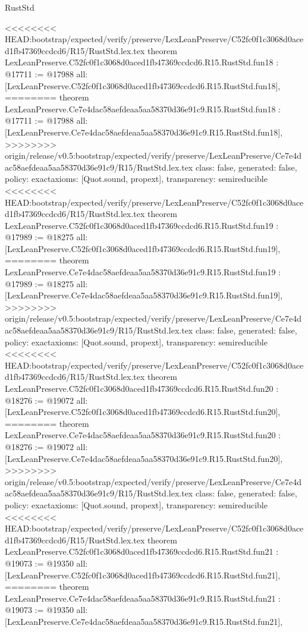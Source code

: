 \begin{lexlean}{RustStd}
\begin{coremodule}
{\begin{coremodule}
{{{{{{{{{{{{{{{{{{{{{}
<<<<<<<< HEAD:bootstrap/expected/verify/preserve/LexLeanPreserve/C52fc0f1c3068d0aced1fb47369ccdcd6/R15/RustStd.lex.tex
theorem LexLeanPreserve.C52fc0f1c3068d0aced1fb47369ccdcd6.R15.RustStd.fun18 : @17711 := @17988 {
  all: [LexLeanPreserve.C52fc0f1c3068d0aced1fb47369ccdcd6.R15.RustStd.fun18],
========
theorem LexLeanPreserve.Ce7e4dac58aefdeaa5aa58370d36e91c9.R15.RustStd.fun18 : @17711 := @17988 {
  all: [LexLeanPreserve.Ce7e4dac58aefdeaa5aa58370d36e91c9.R15.RustStd.fun18],
>>>>>>>> origin/release/v0.5:bootstrap/expected/verify/preserve/LexLeanPreserve/Ce7e4dac58aefdeaa5aa58370d36e91c9/R15/RustStd.lex.tex
  class: false,
  generated: false,
  policy: exact{axioms: [Quot.sound, propext]},
  transparency: semireducible
}
<<<<<<<< HEAD:bootstrap/expected/verify/preserve/LexLeanPreserve/C52fc0f1c3068d0aced1fb47369ccdcd6/R15/RustStd.lex.tex
theorem LexLeanPreserve.C52fc0f1c3068d0aced1fb47369ccdcd6.R15.RustStd.fun19 : @17989 := @18275 {
  all: [LexLeanPreserve.C52fc0f1c3068d0aced1fb47369ccdcd6.R15.RustStd.fun19],
========
theorem LexLeanPreserve.Ce7e4dac58aefdeaa5aa58370d36e91c9.R15.RustStd.fun19 : @17989 := @18275 {
  all: [LexLeanPreserve.Ce7e4dac58aefdeaa5aa58370d36e91c9.R15.RustStd.fun19],
>>>>>>>> origin/release/v0.5:bootstrap/expected/verify/preserve/LexLeanPreserve/Ce7e4dac58aefdeaa5aa58370d36e91c9/R15/RustStd.lex.tex
  class: false,
  generated: false,
  policy: exact{axioms: [Quot.sound, propext]},
  transparency: semireducible
}
<<<<<<<< HEAD:bootstrap/expected/verify/preserve/LexLeanPreserve/C52fc0f1c3068d0aced1fb47369ccdcd6/R15/RustStd.lex.tex
theorem LexLeanPreserve.C52fc0f1c3068d0aced1fb47369ccdcd6.R15.RustStd.fun20 : @18276 := @19072 {
  all: [LexLeanPreserve.C52fc0f1c3068d0aced1fb47369ccdcd6.R15.RustStd.fun20],
========
theorem LexLeanPreserve.Ce7e4dac58aefdeaa5aa58370d36e91c9.R15.RustStd.fun20 : @18276 := @19072 {
  all: [LexLeanPreserve.Ce7e4dac58aefdeaa5aa58370d36e91c9.R15.RustStd.fun20],
>>>>>>>> origin/release/v0.5:bootstrap/expected/verify/preserve/LexLeanPreserve/Ce7e4dac58aefdeaa5aa58370d36e91c9/R15/RustStd.lex.tex
  class: false,
  generated: false,
  policy: exact{axioms: [Quot.sound, propext]},
  transparency: semireducible
}
<<<<<<<< HEAD:bootstrap/expected/verify/preserve/LexLeanPreserve/C52fc0f1c3068d0aced1fb47369ccdcd6/R15/RustStd.lex.tex
theorem LexLeanPreserve.C52fc0f1c3068d0aced1fb47369ccdcd6.R15.RustStd.fun21 : @19073 := @19350 {
  all: [LexLeanPreserve.C52fc0f1c3068d0aced1fb47369ccdcd6.R15.RustStd.fun21],
========
theorem LexLeanPreserve.Ce7e4dac58aefdeaa5aa58370d36e91c9.R15.RustStd.fun21 : @19073 := @19350 {
  all: [LexLeanPreserve.Ce7e4dac58aefdeaa5aa58370d36e91c9.R15.RustStd.fun21],
}}}}}}}}}}}}}}}}}}}}}}}}}
\end{coremodule}}
\end{coremodule}
\end{lexlean}
